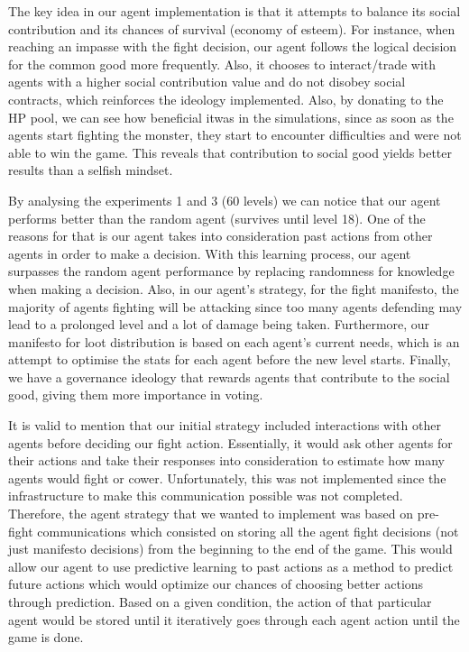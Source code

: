 \newpage

\par The key idea in our agent implementation is that it attempts to balance its social contribution and its chances of survival (economy of esteem). For instance, when reaching an impasse with the fight decision, our agent follows the logical decision for the common good more frequently. Also, it chooses to interact/trade with agents with a higher social contribution value and do not disobey social contracts, which reinforces the ideology implemented. Also, by donating to the HP pool, we can see how beneficial itwas in the simulations, since as soon as the agents start fighting the monster, they start to encounter difficulties and were not able to win the game. This reveals that contribution to social good yields better results than a selfish mindset.

\par By analysing the experiments 1 and 3 (60 levels) we can notice that our agent performs better than the random agent (survives until level 18). One of the reasons for that is our agent takes into consideration past actions from other agents in order to make a decision. With this learning process, our agent surpasses the random agent performance by replacing randomness for knowledge when making a decision. Also, in our agent's strategy, for the fight manifesto, the majority of agents fighting will be attacking since too many agents defending may lead to a prolonged level and a lot of damage being taken. Furthermore, our manifesto for loot distribution is based on each agent's current needs, which is an attempt to optimise the stats for each agent before the new level starts. Finally, we have a governance ideology that rewards agents that contribute to the social good, giving them more importance in voting.


\par It is valid to mention that our initial strategy included interactions with other agents before deciding our fight action. Essentially, it would ask other agents for their actions and take their responses into consideration to estimate how many agents would fight or cower. Unfortunately, this was not implemented since the infrastructure to make this communication possible was not completed. Therefore, the agent strategy that we wanted to implement was based on pre-fight communications which consisted on storing all the agent fight decisions (not just manifesto decisions) from the beginning to the end of the game. This would allow our agent to use predictive learning to past actions as a method to predict future actions which would optimize our chances of choosing better actions through prediction. Based on a given condition, the action of that particular agent would be stored until it iteratively goes through each agent action until the game is done.

